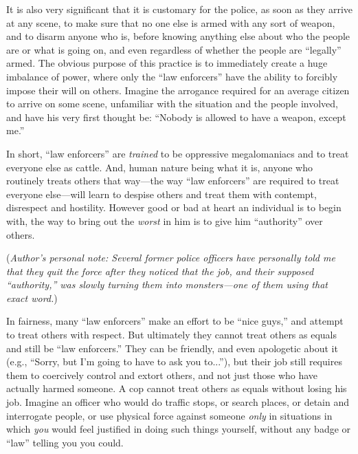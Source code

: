 \documentclass{book}
\begin{document}
It is also very significant that it is customary for the police, as soon as they arrive at any scene, to make sure that no one else is armed with any sort of weapon, and to disarm anyone who is, before knowing anything else about who the people are or what is going on, and even regardless of whether the people are \enquote{legally} armed. The obvious purpose of this practice is to immediately create a huge imbalance of power, where only the \enquote{law enforcers} have the ability to forcibly impose their will on others. Imagine the arrogance required for an average citizen to arrive on some scene, unfamiliar with the situation and the people involved, and have his very first thought be: \enquote{Nobody is allowed to have a weapon, except me.}

In short, \enquote{law enforcers} are \emph{trained} to be oppressive megalomaniacs and to treat everyone else as cattle. And, human nature being what it is, anyone who routinely treats others that way---the way \enquote{law enforcers} are required to treat everyone else---will learn to despise others and treat them with contempt, disrespect and hostility. However good or bad at heart an individual is to begin with, the way to bring out the \emph{worst} in him is to give him \enquote{authority} over others.

(\emph{Author's personal note: Several former police officers have personally told me that they quit the force after they noticed that the job, and their supposed \enquote{authority,} was slowly turning them into monsters---one of them using that exact word.})

In fairness, many \enquote{law enforcers} make an effort to be \enquote{nice guys,} and attempt to treat others with respect. But ultimately they cannot treat others as equals and still be \enquote{law enforcers.} They can be friendly, and even apologetic about it (e.g., \enquote{Sorry, but I'm going to have to ask you to...}), but their job still requires them to coercively control and extort others, and not just those who have actually harmed someone. A cop cannot treat others as equals without losing his job. Imagine an officer who would do traffic stops, or search places, or detain and interrogate people, or use physical force against someone \emph{only} in situations in which \emph{you} would feel justified in doing such things yourself, without any badge or \enquote{law} telling you you could.
\end{document}
